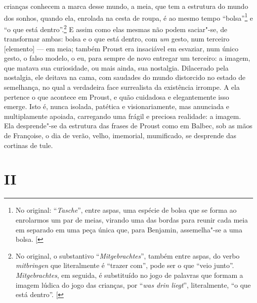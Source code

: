 crianças conhecem a marca desse mundo, a meia, que tem a estrutura do
mundo dos sonhos, quando ela, enrolada na cesta de roupa, é ao mesmo
tempo ``bolsa''\footnote{No original: ``\emph{Tasche}'', entre aspas, uma espécie de bolsa que se forma ao enrolarmos um par de meias, virando uma das bordas para reunir cada meia em separado em uma peça única que, para Benjamin, assemelha"-se a uma bolsa. {[}\versal{N.~T.}{]}} e ``o que está dentro''.\footnote{No original, o substantivo ``\emph{Mitgebrachtes}'', também entre aspas, do verbo \emph{mitbringen} que literalmente é ``trazer com'', pode ser o que ``veio junto''. \emph{Mitgebrachtes}, em seguida, é substituído no jogo de palavras que formam a imagem lúdica do jogo das crianças, por ``\emph{was drin liegt}'', literalmente, ``o que está dentro''. {[}\versal{N.~T.}{]}} E assim como elas mesmas não
podem saciar"-se, de transformar ambas: bolsa e o que está dentro, com
\emph{um} gesto, num terceiro {[}elemento{]} --- em meia; também Proust
era insaciável em esvaziar, num único gesto, o falso modelo, o eu, para
sempre de novo entregar um terceiro: a imagem, que matava sua
curiosidade, ou mais ainda, sua nostalgia. Dilacerado pela nostalgia,
ele deitava na cama, com saudades do mundo distorcido no estado de
semelhança, no qual a verdadeira face surrealista da existência irrompe.
A ela pertence o que acontece em Proust, e quão cuidadosa e
elegantemente isso emerge. Isto é, nunca isolada, patética e
visionariamente, mas anunciada e multiplamente apoiada, carregando uma
frágil e preciosa realidade: a imagem. Ela desprende"-se da estrutura das
frases de Proust como em Balbec, sob as mãos de Françoise, o dia de
verão, velho, imemorial, mumificado, se desprende das cortinas de tule.

\section{II}

